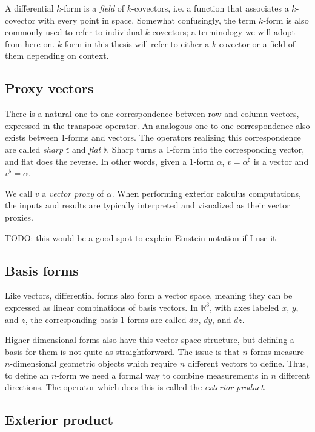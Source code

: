 \documentclass[utf8,english]{gradu3}
\begin{document}
A differential $k$-form is a \textit{field} of $k$-covectors,
i.e. a function that associates a $k$-covector with every point in space.
Somewhat confusingly, the term $k$-form is also commonly used to
refer to individual $k$-covectors;
a terminology we will adopt from here on.
$k$-form in this thesis will refer to either a $k$-covector
or a field of them depending on context.

\subsection{Proxy vectors}

There is a natural one-to-one correspondence between row and column vectors,
expressed in the transpose operator.
An analogous one-to-one correspondence also exists between 1-forms and vectors.
The operators realizing this correspondence are called
\textit{sharp} $\sharp$ and \textit{flat} $\flat$.
Sharp turns a 1-form into the corresponding vector,
and flat does the reverse.
In other words, given a 1-form $\alpha$,
$v = \alpha^{\sharp}$ is a vector and $v^{\flat} = \alpha$.

We call $v$ a \textit{vector proxy} of $\alpha$.
When performing exterior calculus computations,
the inputs and results are typically interpreted
and visualized as their vector proxies.

TODO: this would be a good spot to explain Einstein notation if I use it

\subsection{Basis forms}

Like vectors, differential forms also form a vector space,
meaning they can be expressed as linear combinations of basis vectors.
In $\mathbb{R}^3$, with axes labeled $x$, $y$, and $z$,
the corresponding basis 1-forms are called $dx$, $dy$, and $dz$.

Higher-dimensional forms also have this vector space structure,
but defining a basis for them is not quite as straightforward.
The issue is that $n$-forms measure $n$-dimensional geometric objects
which require $n$ different vectors to define.
Thus, to define an $n$-form we need a formal way to combine
measurements in $n$ different directions.
The operator which does this is called the \textit{exterior product}.

\subsection{Exterior product}
\end{document}
